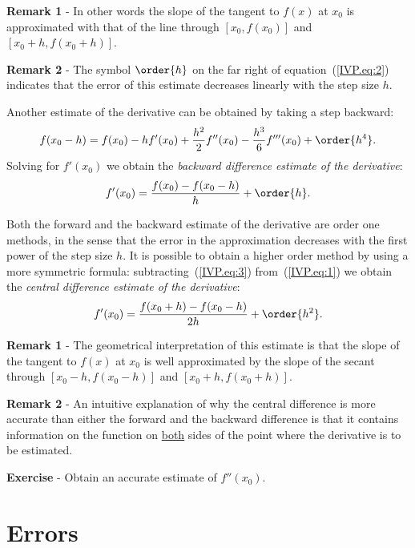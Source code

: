 \noindent
\textbf{Remark 1} - In other words the slope of the tangent to $f(x)$ at
$x_0$ is approximated with that of the line through $[x_0,f(x_0)]$ and
$[x_0+h,f(x_0+h)]$.

\noindent
\textbf{Remark 2} - The symbol $\order{h}$ on the far right of
equation~(\ref{IVP.eq:2}) indicates that the error of this estimate
decreases linearly with the step size $h$.

Another estimate of the derivative can be obtained by taking a step
backward:
%
\begin{equation}
  f(x_0-h) = f(x_0) - h f'(x_0) + \frac{h^2}{2} f''(x_0) -
  \frac{h^3}{6} f'''(x_0) + \order{h^4} .
  \label{IVP.eq:3}
\end{equation}
%
Solving for $f'(x_0)$ we obtain the \textit{backward difference
  estimate of the derivative}:
%
\begin{equation}
  f'(x_0) = \frac{f(x_0)-f(x_0-h)}{h} + \order{h} .
  \label{IVP.eq:4}
\end{equation}

Both the forward and the backward estimate of the derivative are order
one methods, in the sense that the error in the approximation
decreases with the first power of the step size $h$.  It is possible
to obtain a higher order method by using a more symmetric formula:
subtracting~(\ref{IVP.eq:3}) from~(\ref{IVP.eq:1}) we obtain the
\textit{central difference estimate of the derivative}:
%
\begin{equation}
  f'(x_0) = \frac{f(x_0+h)-f(x_0-h)}{2 h} + \order{h^2} .
  \label{IVP.eq:5}
\end{equation}

\noindent
\textbf{Remark 1} - The geometrical interpretation of this estimate is
that the slope of the tangent to $f(x)$ at $x_0$ is well approximated
by the slope of the secant through $[x_0-h,f(x_0-h)]$ and
$[x_0+h,f(x_0+h)]$.

\noindent
\textbf{Remark 2} - An intuitive explanation of why the central
difference is more accurate than either the forward and the backward
difference is that it contains information on the function on
\underline{both} sides of the point where the derivative is to be
estimated.

\noindent
\textbf{Exercise} - Obtain an accurate estimate of $f''(x_0)$.

\section{Errors}


